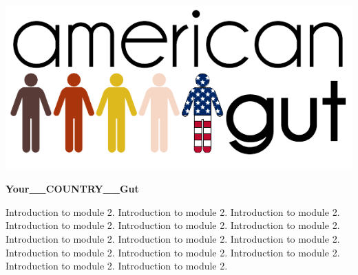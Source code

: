 \documentclass{article}
\begin{document}
\noindent
\parbox[b][10ex][t]{0.3\linewidth}{
\includegraphics[width=1.0\linewidth]{ag_logo.pdf}
}
\hspace{0.5cm}
\parbox[b][10ex][b]{1.0\linewidth}{\bf \Huge Your__COUNTRY__Gut}

\vspace{1cm}
\noindent
Introduction to module 2. Introduction to module 2. Introduction to module 2. Introduction to module 2. Introduction to module 2. Introduction to module 2. Introduction to module 2. Introduction to module 2. Introduction to module 2. Introduction to module 2. Introduction to module 2. Introduction to module 2. Introduction to module 2. Introduction to module 2.
\vspace{0.4cm}
\end{document}
